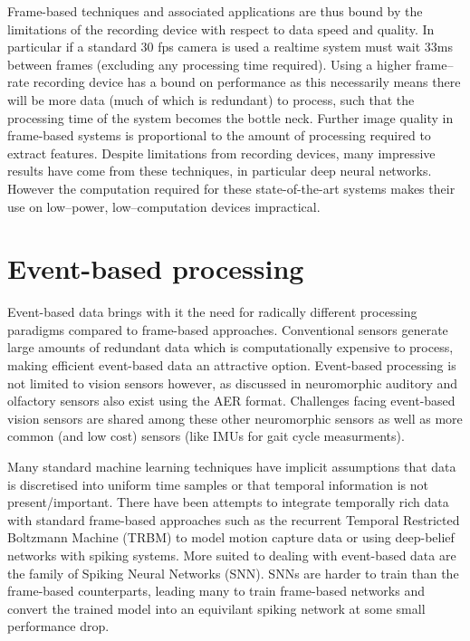 Frame-based techniques and associated applications are thus bound by the limitations of the recording device with respect to data speed and quality. 
In particular if a standard 30 fps camera is used a realtime system must wait 33ms between frames (excluding any processing time required). 
Using a higher frame--rate recording device has a bound on performance as this necessarily means there will be more data (much of which is redundant) to process, such that the processing time of the system becomes the bottle neck. 
Further image quality in frame-based systems is proportional to the amount of processing required to extract features.
Despite limitations from recording devices, many impressive results have come from these techniques, in particular deep neural networks\cite{krizhevsky2012imagenet}.
However the computation required for these state-of-the-art systems makes their use on low--power, low--computation devices impractical. 



\pagebreak
\section{Event-based processing}     %
Event-based data brings with it the need for radically different processing paradigms compared to frame-based approaches\cite{perez2013mapping, martin2015spiking, tan2015benchmarking}.
Conventional sensors generate large amounts of redundant data which is computationally expensive to process, making efficient event-based data an attractive option\cite{vanarse2016review}. 
Event-based processing is not limited to vision sensors however, as discussed in \cite{vanarse2016review} neuromorphic auditory and olfactory sensors also exist using the AER format. 
Challenges facing event-based vision sensors are shared among these other neuromorphic sensors as well as more common (and low cost) sensors (like IMUs for gait cycle measurments\cite{fida2015pre}).

Many standard machine learning techniques have implicit assumptions that data is discretised into uniform time samples or that temporal information is not present/important.
There have been attempts to integrate temporally rich data with standard frame-based approaches such as the recurrent Temporal Restricted Boltzmann Machine (TRBM)\cite{sutskever2009recurrent} to model motion capture data or using deep-belief networks with spiking systems\cite{Neftci2014, pedroni2013neuromorphic, OConnor2013}.
More suited to dealing with event-based data are the family of Spiking Neural Networks (SNN)\cite{henderson2015spike, perez2013mapping}.
SNNs are harder to train than the frame-based counterparts, leading many to train frame-based networks and convert the trained model into an equivilant spiking network at some small performance drop\cite{perez2013mapping, pedroni2013neuromorphic, OConnor2013}.

